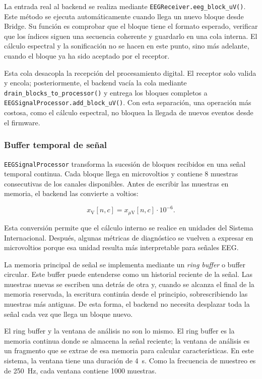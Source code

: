 \documentclass[../main.tex]{subfiles}
\begin{document}
La entrada real al backend se realiza mediante \texttt{EEGReceiver.eeg\_block\_uV()}. Este método se ejecuta automáticamente cuando llega un nuevo bloque desde Bridge. Su función es comprobar que el bloque tiene el formato esperado, verificar que los índices siguen una secuencia coherente y guardarlo en una cola interna. El cálculo espectral y la sonificación no se hacen en este punto, sino más adelante, cuando el bloque ya ha sido aceptado por el receptor.

Esta cola desacopla la recepción del procesamiento digital. El receptor solo valida y encola; posteriormente, el backend vacía la cola mediante \texttt{drain\_blocks\_to\_processor()} y entrega los bloques completos a \texttt{EEGSignalProcessor.add\_block\_uV()}. Con esta separación, una operación más costosa, como el cálculo espectral, no bloquea la llegada de nuevos eventos desde el firmware.

\subsubsection{Buffer temporal de señal}

\texttt{EEGSignalProcessor} transforma la sucesión de bloques recibidos en una señal temporal continua. Cada bloque llega en microvoltios y contiene 8 muestras consecutivas de los canales disponibles. Antes de escribir las muestras en memoria, el backend las convierte a voltios:

\[
x_{\mathrm{V}}[n,c] =
x_{\mu\mathrm{V}}[n,c]\cdot 10^{-6}.
\]

Esta conversión permite que el cálculo interno se realice en unidades del Sistema Internacional. Después, algunas métricas de diagnóstico se vuelven a expresar en microvoltios porque esa unidad resulta más interpretable para señales EEG.

La memoria principal de señal se implementa mediante un \textit{ring buffer} o buffer circular. Este buffer puede entenderse como un historial reciente de la señal. Las muestras nuevas se escriben una detrás de otra y, cuando se alcanza el final de la memoria reservada, la escritura continúa desde el principio, sobrescribiendo las muestras más antiguas. De esta forma, el backend no necesita desplazar toda la señal cada vez que llega un bloque nuevo.

El ring buffer y la ventana de análisis no son lo mismo. El ring buffer es la memoria continua donde se almacena la señal reciente; la ventana de análisis es un fragmento que se extrae de esa memoria para calcular características. En este sistema, la ventana tiene una duración de \SI{4}{\second}. Como la frecuencia de muestreo es de \SI{250}{\hertz}, cada ventana contiene 1000 muestras.
\end{document}
